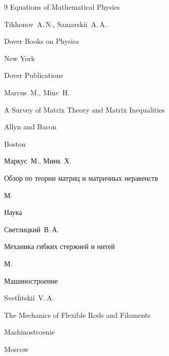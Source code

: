 \begin{thebibliography}{9}
\book Equations of Mathematical Physics

\by Tikhonov~A.\,N., Samarskii~A.\,A.

\serial Dover Books on Physics

\publaddr New York

\publ Dover Publications









\by Marcus~M.,  Minc~H.

\book A Survey of Matrix Theory and Matrix Inequalities

\publ Allyn and Bacon

\publaddr Boston



\rtransl

\by Маркус~М., Минк~Х.

\book  Обзор по теории матриц и матричных неравенств

\publaddr М.

\publ Наука












\by Светлицкий~В.\,А.

\book Механика гибких стержней и нитей

\publaddr М.

\publ Машиностроение



\misctransl

\by Svetlitskii~V.\,A.

\book The Mechanics of Flexible Rods and Filaments

\publ Mashinostroenie

\publaddr Moscow









\end{thebibliography}
